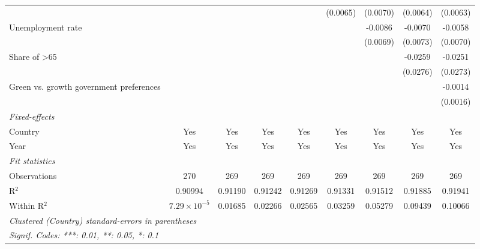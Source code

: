\begin{table}[htbp]
\begin{tabular}{lcccccccc}
                                                                               &                       &          &          &          & (0.0065) & (0.0070) & (0.0064)      & (0.0063)\\   
      Unemployment rate                                                        &                       &          &          &          &          & -0.0086  & -0.0070       & -0.0058\\   
                                                                               &                       &          &          &          &          & (0.0069) & (0.0073)      & (0.0070)\\   
      Share of >65                                                             &                       &          &          &          &          &          & -0.0259       & -0.0251\\   
                                                                               &                       &          &          &          &          &          & (0.0276)      & (0.0273)\\   
      Green vs. growth government preferences                                  &                       &          &          &          &          &          &               & -0.0014\\   
                                                                               &                       &          &          &          &          &          &               & (0.0016)\\   
      \midrule
      \emph{Fixed-effects}\\
      Country                                                                  & Yes                   & Yes      & Yes      & Yes      & Yes      & Yes      & Yes           & Yes\\  
      Year                                                                     & Yes                   & Yes      & Yes      & Yes      & Yes      & Yes      & Yes           & Yes\\  
      \midrule
      \emph{Fit statistics}\\
      Observations                                                             & 270                   & 269      & 269      & 269      & 269      & 269      & 269           & 269\\  
      R$^2$                                                                    & 0.90994               & 0.91190  & 0.91242  & 0.91269  & 0.91331  & 0.91512  & 0.91885       & 0.91941\\  
      Within R$^2$                                                             & $7.29\times 10^{-5}$  & 0.01685  & 0.02266  & 0.02565  & 0.03259  & 0.05279  & 0.09439       & 0.10066\\  
      \midrule \midrule
      \multicolumn{9}{l}{\emph{Clustered (Country) standard-errors in parentheses}}\\
      \multicolumn{9}{l}{\emph{Signif. Codes: ***: 0.01, **: 0.05, *: 0.1}}\\
   \end{tabular}
\end{table}


